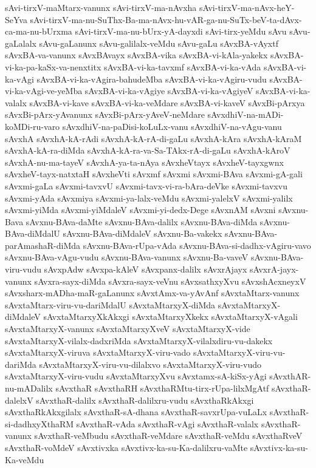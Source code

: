 {sAvi-tirxV-maMtarx-vanunx
sAvi-tirxV-ma-nAvxha
sAvi-tirxV-ma-nAvx-heY-SeYva
sAvi-tirxV-ma-nu-SuThx-Ba-ma-nAvx-hu-vAR-ga-nu-SuTx-beV-ta-dAvx-ca-ma-nu-bUrxma
sAvi-tirxV-ma-nu-bUrx-yA-dayxdi
sAvi-tirx-yeMdu
sAvu
sAvu-gaLalalx
sAvu-gaLanunx
sAvu-galilalx-veMdu
sAvu-gaLu
sAvxBA-vAyxtf
sAvxBA-va-vanunx
sAvxBAvayx
sAvxBA-vika
sAvxBA-vi-kAla-yakekx
sAvxBA-vi-ka-pa-kaSx-va-nenxtitx
sAvxBA-vi-ka-tavxmf
sAvxBA-vi-ka-vAda
sAvxBA-vi-ka-vAgi
sAvxBA-vi-ka-vAgira-bahudeMba
sAvxBA-vi-ka-vAgiru-vudu
sAvxBA-vi-ka-vAgi-ve-yeMba
sAvxBA-vi-ka-vAgiye
sAvxBA-vi-ka-vAgiyeV
sAvxBA-vi-ka-valalx
sAvxBA-vi-kave
sAvxBA-vi-ka-veMdare
sAvxBA-vi-kaveV
sAvxBi-pArxya
sAvxBi-pArx-yAvanunx
sAvxBi-pArx-yAveV-neMdare
sAvxdhiV-na-mADi-koMDi-ru-varo
sAvxdhiV-na-paDisi-koLuLx-vanu
sAvxdhiV-na-vAgu-vanu
sAvxhA
sAvxhA-kA-rAdi
sAvxhA-kA-rA-di-gaLu
sAvxhA-kAra
sAvxhA-kAraM
sAvxhA-kA-ra-diMda
sAvxhA-kA-ra-va-Sa-TAkx-rA-di-gaLu
sAvxhA-kAroV
sAvxhA-nu-ma-tayeV
sAvxhA-ya-ta-nAya
sAvxheVtayx
sAvxheV-tayxgwnx
sAvxheV-tayx-natxtaH
sAvxheVti
sAvxmf
sAvxmi
sAvxmi-BAva
sAvxmi-gA-gali
sAvxmi-gaLa
sAvxmi-tavxvU
sAvxmi-tavx-vi-ra-bAra-deVke
sAvxmi-tavxvu
sAvxmi-yAda
sAvxmiya
sAvxmi-ya-lalx-veMdu
sAvxmi-yalelxV
sAvxmi-yalilx
sAvxmi-yiMda
sAvxmi-yiMdaleV
sAvxmi-yi-dedx-Dege
sAvxnAM
sAvxni
sAvxnu-Bava
sAvxnu-BAva-daMte
sAvxnu-BAva-dalilx
sAvxnu-BAva-diMda
sAvxnu-BAva-diMdalU
sAvxnu-BAva-diMdaleV
sAvxnu-Ba-vakekx
sAvxnu-BAva-parAmashaR-diMda
sAvxnu-BAva-rUpa-vAda
sAvxnu-BAva-si-dadhx-vAgiru-vavo
sAvxnu-BAva-vAgu-vudu
sAvxnu-BAva-vanunx
sAvxnu-Ba-vaveV
sAvxnu-BAva-viru-vudu
sAvxpAdw
sAvxpa-kAleV
sAvxpanx-dalilx
sAvxrAjayx
sAvxrA-jayx-vanunx
sAvxra-sayx-diMda
sAvxra-sayx-veVnu
sAvxsathxyXvu
sAvxshAcxneyxV
sAvxsharx-mADha-maR-gaLanunx
sAvxtAmx-va-yAvAnf
sAvxtaMtarx-vanunx
sAvxtaMtarx-viru-vu-dariMdalU
sAvxtaMtarxyX-diMda
sAvxtaMtarxyX-diMdaleV
sAvxtaMtarxyXkAkxgi
sAvxtaMtarxyXkekx
sAvxtaMtarxyX-vAgali
sAvxtaMtarxyX-vanunx
sAvxtaMtarxyXveV
sAvxtaMtarxyX-vide
sAvxtaMtarxyX-vilalx-dadxriMda
sAvxtaMtarxyX-vilalxdiru-vu-dakekx
sAvxtaMtarxyX-viruva
sAvxtaMtarxyX-viru-vado
sAvxtaMtarxyX-viru-vu-dariMda
sAvxtaMtarxyX-viru-vu-dilalxvo
sAvxtaMtarxyX-viru-vudo
sAvxtaMtarxyX-viru-vudu
sAvxtaMtarxyXvu
sAvxtamx-sA-kiSx-yAgi
sAvxthAR-nu-mADalilx
sAvxthaR
sAvxthaRH
sAvxthaRMtu-tirx-rUpa-lilxMgAtf
sAvxthaR-dalelxV
sAvxthaR-dalilx
sAvxthaR-dalilxru-vudu
sAvxthaRkAkxgi
sAvxthaRkAkxgilalx
sAvxthaR-sA-dhana
sAvxthaR-savxrUpa-vuLaLx
sAvxthaR-si-dadhxyXthaRM
sAvxthaR-vAda
sAvxthaR-vAgi
sAvxthaR-valalx
sAvxthaR-vanunx
sAvxthaR-veMbudu
sAvxthaR-veMdare
sAvxthaR-veMdu
sAvxthaRveV
sAvxthaR-voMdeV
sAvxtivxka
sAvxtivx-ka-su-Ka-dalilxru-vaMte
sAvxtivx-ka-su-Ka-veMdu
}
